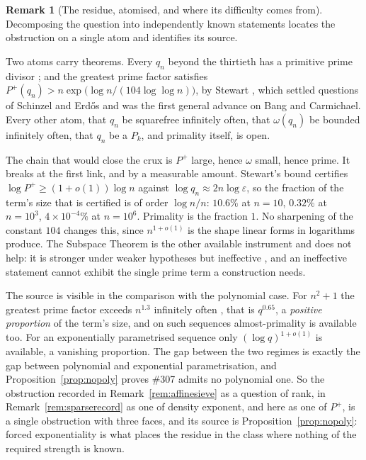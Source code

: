 \documentclass[11pt]{article}
\theoremstyle{definition}
\newtheorem{remark}[theorem]{Remark}
\begin{document}
\begin{remark}[The residue, atomised, and where its difficulty comes from]\label{rem:atomised}
Decomposing the question into independently known statements locates the obstruction on a single
atom and identifies its source.

Two atoms carry theorems. Every $q_n$ beyond the thirtieth has a primitive prime divisor
\cite{BHV2001}; and the greatest prime factor satisfies
$P^+(q_n)>n\exp\bigl(\log n/(104\log\log n)\bigr)$, by Stewart \cite{Stewart2013}, which settled
questions of Schinzel and Erd\H{o}s and was the first general advance on Bang and Carmichael. Every
other atom, that $q_n$ be squarefree infinitely often, that $\omega(q_n)$ be bounded infinitely
often, that $q_n$ be a $P_k$, and primality itself, is open.

The chain that would close the crux is $P^+$ large, hence $\omega$ small, hence prime. It breaks at
the first link, and by a measurable amount. Stewart's bound certifies
$\log P^+\ge(1+o(1))\log n$ against $\log q_n\approx2n\log\varepsilon$, so the fraction of the
term's size that is certified is of order $\log n/n$: $10.6\%$ at $n=10$, $0.32\%$ at $n=10^3$,
$4\times10^{-4}\%$ at $n=10^6$. Primality is the fraction $1$. No sharpening of the constant $104$
changes this, since $n^{1+o(1)}$ is the shape linear forms in logarithms produce. The Subspace
Theorem is the other available instrument and does not help: it is stronger under weaker hypotheses
but ineffective \cite{BCZ2003}, and an ineffective statement cannot exhibit the single prime term a
construction needs.

The source is visible in the comparison with the polynomial case. For $n^2+1$ the greatest prime
factor exceeds $n^{1.3}$ infinitely often \cite{Merikoski2019}, that is $q^{0.65}$, a \emph{positive
proportion} of the term's size, and on such sequences almost-primality is available too. For an
exponentially parametrised sequence only $(\log q)^{1+o(1)}$ is available, a vanishing proportion.
The gap between the two regimes is exactly the gap between polynomial and exponential
parametrisation, and Proposition~\ref{prop:nopoly} proves \#307 admits no polynomial one. So the
obstruction recorded in Remark~\ref{rem:affinesieve} as a question of rank, in
Remark~\ref{rem:sparserecord} as one of density exponent, and here as one of $P^+$, is a single
obstruction with three faces, and its source is Proposition~\ref{prop:nopoly}: forced exponentiality
is what places the residue in the class where nothing of the required strength is known.


\end{remark}
\end{document}
